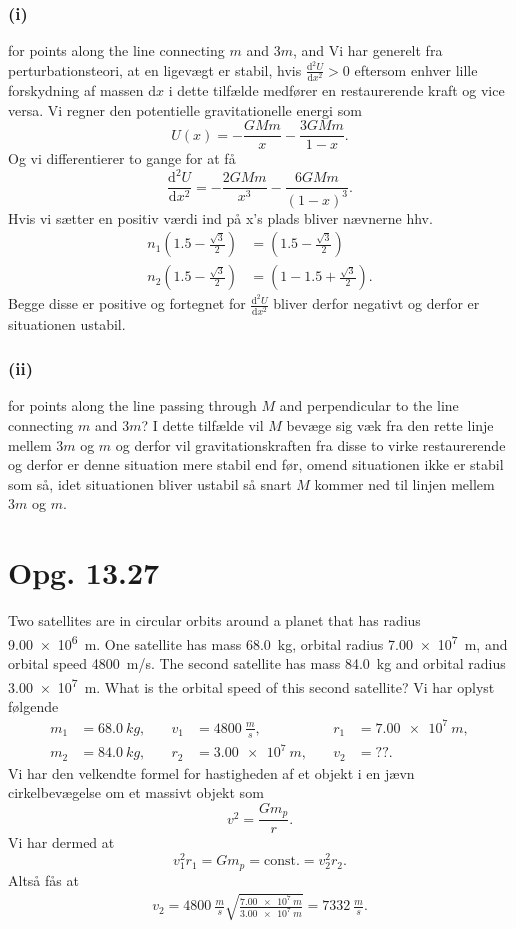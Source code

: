 \documentclass[12pt]{article}
\theoremstyle{definition}
\begin{document}
\subsubsection*{(i)}
for points along the line connecting $m$ and $3m$, and
\bigbreak
Vi har generelt fra perturbationsteori, at en ligevægt er stabil, hvis $\frac{\mathrm{d}^2U}{\mathrm{d}x^2} > 0$ eftersom enhver lille forskydning af massen $\mathrm{d}x$ i dette tilfælde medfører en restaurerende kraft og vice versa. 
Vi regner den potentielle gravitationelle energi som
\[ 
U(x) = - \frac{GMm}{x} - \frac{3GMm}{1-x}
.\]
Og vi differentierer to gange for at få
\[ 
\frac{\mathrm{d}^2U}{\mathrm{d}x^2} = - \frac{2GMm}{x^3} - \frac{6GMm}{(1-x)^3}
.\]
Hvis vi sætter en positiv værdi ind på x's plads bliver nævnerne hhv.
\begin{align*}
  n_1 \left(\num{1,5} - \frac{\sqrt{3}}{2} \right) &= \left( \num{1,5} - \frac{\sqrt{3}}{2} \right) \\
  n_2 \left( \num{1,5} - \frac{\sqrt{3}}{2} \right) &= \left( 1 - \num{1,5} + \frac{\sqrt{3}}{2} \right)
.\end{align*}
Begge disse er positive og fortegnet for $\frac{\mathrm{d}^2U}{\mathrm{d}x^2}$ bliver derfor negativt og derfor er situationen ustabil.


\subsubsection*{(ii)}
for points along the line passing through $M$ and perpendicular to the line connecting $m$ and $3m$?
\bigbreak
I dette tilfælde vil $M$ bevæge sig væk fra den rette linje mellem $3m$ og $m$ og derfor vil gravitationskraften fra disse to virke restaurerende og derfor er denne situation mere stabil end før, omend situationen ikke er stabil som så, idet situationen bliver ustabil så snart $M$ kommer ned til linjen mellem $3m$ og $m$.

\section*{Opg. 13.27}
Two satellites are in circular orbits around a planet that has radius \qty{9,00e6}{m}. One satellite has mass \qty{68,0}{kg}, orbital radius \qty{7,00e7}{m}, and orbital speed \qty{4800}{m/s}. The second satellite has mass \qty{84,0}{kg} and orbital radius \qty{3,00e7}{m}. What is the orbital speed of this second satellite?
\bigbreak
Vi har oplyst følgende
\begin{align*}
  m_1 &= \qty{68,0}{kg},  &\quad v_1 &= \qty{4800}{\frac{m}{s}}, &\quad r_1 &= \qty{7,00e7}{m},  \\
  m_2 &= \qty{84,0}{kg}, &\quad r_2 &= \qty{3,00e7}{m}, &\quad v_2 &= ??
.\end{align*}
Vi har den velkendte formel for hastigheden af et objekt i en jævn cirkelbevægelse om et massivt objekt som
\[ 
v^2 = \frac{Gm_p}{r}
.\]
Vi har dermed at
\[ 
  v_1^2 r_1 = Gm_p = \mathrm{const.} = v_2^2 r_2
.\]
Altså fås at
\begin{align*}
  v_2 = \qty{4800}{\frac{m}{s}} \sqrt{\frac{\qty{7,00e7}{m}}{\qty{3,00e7}{m}}} = \qty{7332}{\frac{m}{s}} 
.\end{align*}
\end{document}
